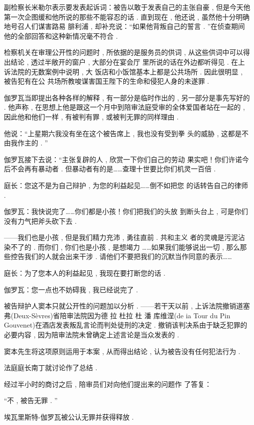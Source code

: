 副检察长米勒尔表示要发表起诉词：被告以敢于发表自己的主张自豪 , 但是今天他第一次企图缓和他所说的那些不能容忍的话 . 直到现在 , 他还说 , 虽然他十分明确地号召人们谋害路易 \textbullet 腓利浦 , 却补充说：“如果他背叛自己的誓言 . ”在侦查期间他的全部回答和这种新情况毫不符合 . 

检察机关在审理公开性的问题时 , 所依据的是服务员的供词 , 从这些供词中可以得出结论 , 透过半敞开的窗户 , 大部分在宴会厅 里所说的话在外边都听得见 . 在上诉法院的无数案例中说明 , 大 饭店和小饭馆基本上都是公共场所 . 因此很明显 , 被告犯有在公 共场所教唆谋害国王陛下的生命和侵犯人身的未遂罪 . 

伽罗瓦当即提出各种各样的解释 , 有一部分是临时作出的 , 另一部分是事先写好的 . 他声称 , 在思想上他是跟这一个月中到陪审法庭受审的全体爱国者站在一起的 , 因此他和他们一样 , 有被判有罪 , 或被判无罪的同样理由 . 

他说：“上星期六我没有坐在这个被告席上 , 我也没有受到拳 头的威胁 , 这都是不由我作主的 . ”

伽罗瓦接下去说：“主张复辟的人 , 欣赏一下你们自己的劳动 果实吧！你们许诺今后不会再有暴动者 . 但暴动者有的是……查理十世要比你们机灵一百倍 . 

庭长：您这不是为自己辩护 , 为您的利益起见……倒不如把您 的话转告自己的律师 . 

伽罗瓦：我快说完了……你们都是小孩！你们把我们的头放 到断头台上 , 可是你们没有力气把斧头砍下去 . 

——我们也是小孩 , 但是我们精力充沛 , 勇往直前 . 共和主义 者的灵魂是污泥沾染不了的 . 而你们 , 你们也是小孩 , 是想竭力 ……如果我们能够说出一切 , 那么那些控告我们的人就会出来干涉 . 请他们不要把我们的沉默当作同意的表示……

庭长：为了您本人的利益起见 , 我现在要打断您的话 . 

伽罗瓦：您一点也不妨碍我 , 我已经说完了 . 

被告辩护人窦本只就公开性的问题加以分析 . ——若干天以前 , 上诉法院撤销道塞弗(Deux-Sèvres)省陪审法院因为德 \textbullet 拉 \textbullet 杜拉 \textbullet 杜 \textbullet 潘 \textbullet 库维涅(de ia Tour du Pin Gouvenet)在酒店发表叛乱言论而判处徒刑的决定 . 撤销该判决系由于缺乏犯罪的必要内容 , 因为陪审法院未曾确定上述言论是当众发表的 . 

窦本先生将这项原则运用于本案 , 从而得出结论 , 认为被告没有任何犯法行为 . 

法庭庭长南丁就讨论作了总结 . 

经过半小时的商讨之后 , 陪审员们对向他们提出来的问题作 了答复：

“不 , 被告无罪 . ”

埃瓦里斯特-伽罗瓦被公认无罪并获得释放 . 

